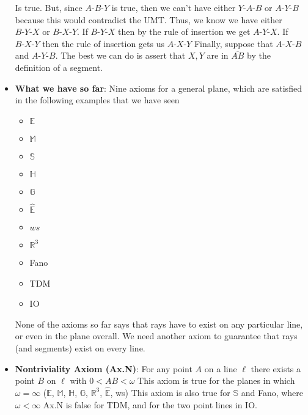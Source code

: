 \documentclass{report}
\begin{document}
\begin{itemize}
            Is true. But, since $ A\text{-}B\text{-}Y$ is true, then we can't have either $ Y\text{-}A\text{-}B$ or $ A\text{-}Y\text{-}B$ because this would contradict the UMT. Thus, we know we have either $ B\text{-}Y\text{-}X$  or $ B\text{-}X\text{-}Y$. If $ B\text{-}Y\text{-}X$ then by the rule of insertion we get $ A\text{-}Y\text{-}X$. If $ B\text{-}X\text{-}Y $ then the rule of insertion gets us $ A\text{-}X\text{-}Y$
            \bigbreak \noindent 
            Finally, suppose that $ A\text{-}X\text{-}B$ and $ A\text{-}Y\text{-}B$. The best we can do is assert that $X,Y$ are in $ \overline{AB}$ by the definition  of a segment.
        \item \textbf{What we have so far}: Nine axioms for a general plane, which are satisfied in the following examples that we have seen
            \begin{itemize}
                \item $\mathbb{E} $
                \item $\mathbb{M} $
                \item $\mathbb{S} $
                \item $\mathbb{H} $
                \item $\mathbb{G} $
                \item $\hat{\mathbb{E}} $
                \item $ws$
                \item $\mathbb{R}^{3} $
                \item Fano
                \item TDM
                \item IO
            \end{itemize}
            None of the axioms so far says that rays have to exist on any particular line, or even in the plane overall. We need another axiom to guarantee that rays (and segments) exist on every line.
        \item \textbf{Nontriviality Axiom (Ax.N)}: For any point $A$ on a line $\ell$ there exists a point $B$ on $\ell$ with $0 < AB < \omega$
            \bigbreak \noindent 
            This axiom is true for the planes in which $\omega = \infty$ ($\mathbb{E}$, $\mathbb{M}$, $\mathbb{H}$, $\mathbb{G}$, $\mathbb{R}^{3}$, $\hat{\mathbb{E}} $, ws)
            \bigbreak \noindent 
            This axiom is also true for $\mathbb{S}$ and Fano, where $\omega < \infty $
            \bigbreak \noindent 
            Ax.N is false for TDM, and for the two point lines in IO.
            \bigbreak \noindent 

\end{itemize}
\end{document}
